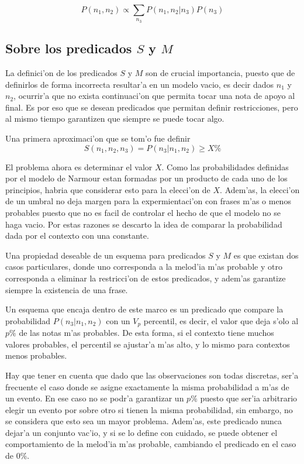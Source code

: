 $$P(n_1, n_2) \propto \sum_{n_3}P(n_1,n_2|n_3)P(n_3)$$



\subsection{Sobre los predicados $S$ y $M$}
\label{sec:must_predicates}
La definici'on de los predicados $S$ y $M$ son de crucial importancia, puesto que de definirlos de forma incorrecta resultar'a en un modelo vacio, 
es decir dados $n_1$ y $n_2$, ocurrir'a que no exista continuaci'on que permita tocar una nota de apoyo al final. 
Es por eso que se desean predicados que permitan definir restricciones, pero al mismo tiempo garantizen que siempre se puede tocar algo.

Una primera aproximaci'on que se tom'o fue definir 
$$S(n_1, n_2, n_3) = P(n_3 | n_1, n_2) \geq X\%$$

El problema ahora es determinar
el valor $X$. Como las probabilidades definidas por el modelo de Narmour estan formadas por un producto de cada uno de los principios, habria 
que considerar esto para la elecci'on de $X$. Adem'as, la elecci'on de un umbral no deja margen para la expermientaci'on con frases
m'as o menos probables puesto que no es facil de controlar el hecho de que el modelo no se haga vacio. 
Por estas razones se descarto la idea de comparar la probabilidad dada por el contexto con una constante. 

Una propiedad deseable de un esquema para predicados $S$ y $M$ es que existan dos casos particulares, 
donde uno corresponda a la melod'ia m'as probable
y otro corresponda a eliminar la restricci'on de estos predicados, y adem'as garantize siempre la existencia de una frase. 

Un esquema que encaja dentro de este marco es un predicado que compare la probabilidad $P(n_3 | n_1, n_2)$ con un 
$V_p$ percentil, es decir, el valor que deja s'olo al $p\%$ de las notas m'as probables.  De esta forma, si el contexto tiene muchos valores probables, 
el percentil se ajustar'a m'as alto, y lo mismo para contextos menos probables.

Hay que tener en cuenta que dado que las observaciones son todas discretas, ser'a frecuente el caso donde 
se asigne exactamente la misma probabilidad a m'as de un evento. En ese caso no se podr'a garantizar un $p\%$ puesto que ser'ia arbitrario
elegir un evento por sobre otro si tienen la misma probabilidad, sin embargo, no se considera que esto sea un mayor problema. Adem'as, este predicado nunca dejar'a un conjunto vac'io, y si se lo define con cuidado, se puede obtener
el comportamiento de la melod'ia m'as probable, cambiando el predicado en el caso de $0\%$.

